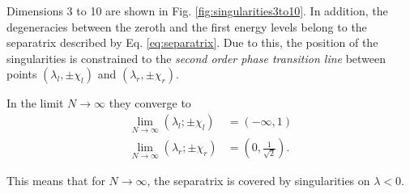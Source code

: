 Dimensions 3 to 10 are shown in Fig. \ref{fig:singularities3to10}.
In addition, the degeneracies between the zeroth and the first energy levels belong to the separatrix described by Eq. \ref{eq:separatrix}. Due to this, the position of the singularities is constrained to the \emph{second order phase transition line} between points $(\lambda_l,\pm\chi_l)$ and $(\lambda_r,\pm\chi_r)$.



In the limit $N\rightarrow\infty$ they converge to
\begin{align*}
    \lim_{N\rightarrow \infty}(\lambda_l ;\pm\chi_l)&= \left(-\infty,1\right)\\
    \lim_{N\rightarrow \infty}(\lambda_r ;\pm\chi_r)&= \left(0,\frac{1}{\sqrt{2}}\right).
\end{align*}

This means that for $N\rightarrow \infty$, the separatrix is covered by singularities on $\lambda<0$.

